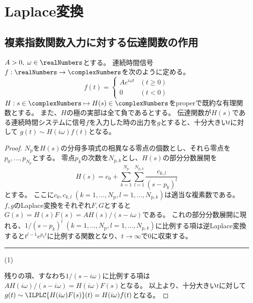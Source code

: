 \part{Laplace変換}
	\chapter{複素指数関数入力に対する伝達関数の作用}
		\begin{shadebox}
			$A>0,\;\omega \in \realNumbers$とする。
			連続時間信号$f: \realNumbers \to \complexNumbers$を次のように定める。
			\[
				f(t) =
				\begin{cases}
					Ae^{i\omega t} & (t\geq 0) \\
					0 & (t<0)
				\end{cases}
			\]
			$H: s\in\complexNumbers \mapsto H(s) \in \complexNumbers$をproperで既約な有理関数とする。
			また、$H$の極の実部は全て負であるとする。
			伝達関数が$H(s)$である連続時間システムに信号$f$を入力した時の出力を$g$とすると、十分大きい$t$に対して
			$g(t) \sim H(i\omega)f(t)$となる。
		\end{shadebox}
		\begin{proof}
			\quad\par
			$N_\text{p}$を$H(s)$の分母多項式の相異なる零点の個数とし、それら零点を$p_0,\dots,p_{N_\text{p}}$とする。
			零点$p_k$の次数を$N_{\text{p},k}$とし、$H(s)$の部分分数展開を
			\[ H(s) = c_0 + \sum_{k=1}^{N_\mathrm{p}} \sum_{l=1}^{N_{\mathrm{p},k}} \frac{c_{k,l}}{(s-p_k)^l} \]
			とする。
			ここに$c_0,c_{k,l}\;(k=1,\dots,N_\mathrm{p},l=1,\dots,N_{\mathrm{p},k})$は適当な複素数である。
			$f,g$のLaplace変換をそれぞれ$F,G$とすると$G(s) = H(s)F(s) = A H(s)/(s-i\omega)$である。
			これの部分分数展開に現れる、$1/(s-p_k)^l\;(k=1,\dots,N_\mathrm{p},l=1,\dots,N_{\mathrm{p},k})$に比例する項は逆Laplace変換すると$t^{l-1}e^{p_k t}$に比例する関数となり、$t\to\infty$で0に収束する。\hfill \rule{10cm}{0.4pt}(1)
			\par
			残りの項、すなわち$1/(s-i\omega)$に比例する項は$AH(i\omega)/(s-i\omega) = H(i\omega)F(s)$となる。
			以上より、十分大きい$t$に対して$g(t) \sim \ILPLC{H(i\omega)F(s)}(t) = H(i\omega)f(t)$となる。
		\end{proof}
